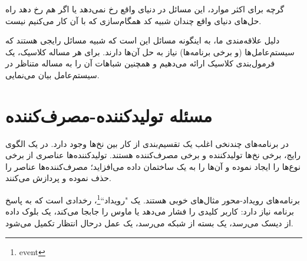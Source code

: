 \documentclass{book}
\begin{document}
    گرچه برای اکثر موارد، این مسائل در دنیای واقع رخ نمی‌دهد یا اگر هم رخ دهد راه حل‌های دنیای واقع چندان شبیه کد همگام‌سازی 
    که با آن کار می‌کنیم نیست. 

    دلیل علاقه‌مندی ما، به اینگونه مسائل این است که شبیه مسائل رایجی هستند که سیستم‌عامل‌ها  (و برخی برنامه‌ها) نیاز به حل آن‌ها دارند. 
    برای هر مساله کلاسیک، یک فرمول‌بندی کلاسیک ارائه می‌دهیم و همچنین شباهات آن را به مساله متناظر در سیستم‌عامل  بیان می‌نمایی. 

\section{مسئله تولیدکننده-مصرف‌کننده}

    در برنامه‌های چندنخی اغلب یک تقسیم‌بندی از کار بین نخ‌ها وجود دارد. در یک الگوی رایج، برخی نخ‌ها تولیدکننده و برخی مصرف‌کننده هستند. 
    تولیدکننده‌ها عناصری از برخی نوع‌ها را ایجاد نموده و آن‌ها را به یک ساختمان داده می‌افزاید؛ مصرف‌کننده‌ها عناصر را حذف نموده و پردازش می‌کنند.


    برنامه‌های رویداد-محور مثال‌های خوبی هستند. یک "رویداد``\footnote{event}، رخدادی است که به پاسخ برنامه نیاز دارد: 
    کاربر کلیدی را فشار می‌دهد یا ماوس را جابجا می‌کند، یک بلوک داده از دیسک می‌رسد، یک بسته از شبکه می‌رسد، یک عمل در‌حال انتظار تکمیل می‌شود.
\end{document}
